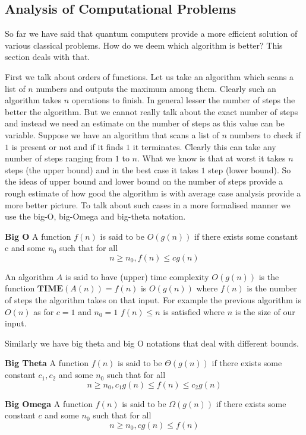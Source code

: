 \subsection{Analysis of Computational Problems}

So far we have said that quantum computers provide a more efficient solution of various classical problems. How do we deem which algorithm is better? This section deals with that.

First we talk about orders of functions. Let us take an algorithm which scans a list of $n$ numbers and outputs the maximum among them. Clearly such an algorithm takes $n$ operations to finish. In general lesser the number of steps the better the algorithm. But we cannot really talk about the exact number of steps and instead we need an estimate on the number of steps as this value can be variable. Suppose we have an algorithm that scans a list of $n$ numbers to check if $1$ is present or not and if it finds $1$ it terminates. Clearly this can take any number of steps ranging from $1$ to $n$. What we know is that at worst it takes $n$ steps (the upper bound) and in the best case it takes $1$ step (lower bound). So the ideas of upper bound and lower bound on the number of steps provide a rough estimate of how good the algorithm is with average case analysis provide a more better picture. To talk about such cases in a more formalised manner we use the big-O, big-Omega and big-theta notation.

\begin{definition}
\textbf{Big O} A function $f(n)$ is said to be $O(g(n))$ if there exists some constant c and some $n_0$ such that for all $$n \geq n_0,  f(n) \leq cg(n)$$
\end{definition}
An algorithm $A$ is said to have (upper) time complexity $O(g(n))$ is the function $\textbf{TIME}(A(n)) = f(n)$ is $O(g(n))$ where $f(n)$ is the number of steps the algorithm takes on that input.
For example the previous algorithm is $O(n)$ as for $c = 1$ and $n_0 = 1$
$f(n) \leq n$ is satisfied where $n$ is the size of our input.

Similarly we have big theta and big O notations that deal with different bounds.

\begin{definition}
\textbf{Big Theta} A function $f(n)$ is said to be $\Theta (g(n))$ if there exists some constant $c_1, c_2$ and some $n_0$ such that for all $$n \geq n_0,  c_1 g(n) \leq f(n) \leq c_2 g(n)$$
\end{definition}
\begin{definition}
\textbf{Big Omega} A function $f(n)$ is said to be $\Omega (g(n))$ if there exists some constant $c$ and some $n_0$ such that for all $$n \geq n_0,  c g(n) \leq f(n)$$
\end{definition}

